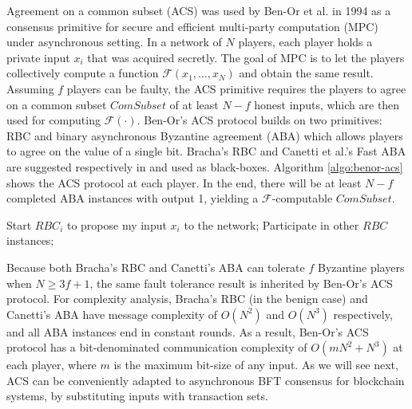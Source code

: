 Agreement on a common subset (ACS) was used by Ben-Or et al.  in 1994 as a consensus primitive for secure and efficient multi-party computation (MPC) under asynchronous setting. In a network of $N$ players, each player holds a private input $x_i$ that was acquired secretly. The goal of MPC is to let the players collectively compute a function $\mathcal{F}(x_1,...,x_N)$ and obtain the same result.
Assuming $f$ players can be faulty, the ACS primitive requires the players to agree on a common subset $ComSubset$ of at least $N-f$ honest inputs, which are then used for computing $\mathcal{F}(\cdot)$. 
Ben-Or's ACS protocol builds on two primitives: RBC and binary asynchronous Byzantine agreement (ABA) which allows players to agree on the value of a single bit. Bracha's RBC  and Canetti et al.'s Fast ABA  are suggested respectively in  and used as black-boxes. Algorithm \ref{algo:benor-acs} shows the ACS protocol at each player. In the end, there will be at least $N-f$ completed ABA instances with output 1, yielding a $\mathcal{F}$-computable $ComSubset$.
\begin{algorithm}
\label{algo:benor-acs}
\caption{Ben-Or's ACS protocol (at player $P_i$)}
\SetAlgoLined
{}
\setcounter{AlgoLine}{0}
Start $RBC_i$ to propose my input $x_i$ to the network;
Participate in other $RBC$ instances;
\end{algorithm}
Because both Bracha's RBC and Canetti's ABA can tolerate $f$ Byzantine players when $N\geq3f+1$, the same fault tolerance result is inherited by Ben-Or's ACS protocol. For complexity analysis, Bracha's RBC (in the benign case) and Canetti's ABA have message complexity of $O(N^2)$ and $O(N^3)$  respectively, and all ABA instances end in constant rounds. As a result, Ben-Or's ACS protocol has a bit-denominated communication complexity of $O(m N^2+N^3)$ at each player, where $m$ is the maximum bit-size of any input.
As we will see next, ACS can be conveniently adapted to asynchronous BFT consensus for blockchain systems, by substituting inputs with transaction sets.

